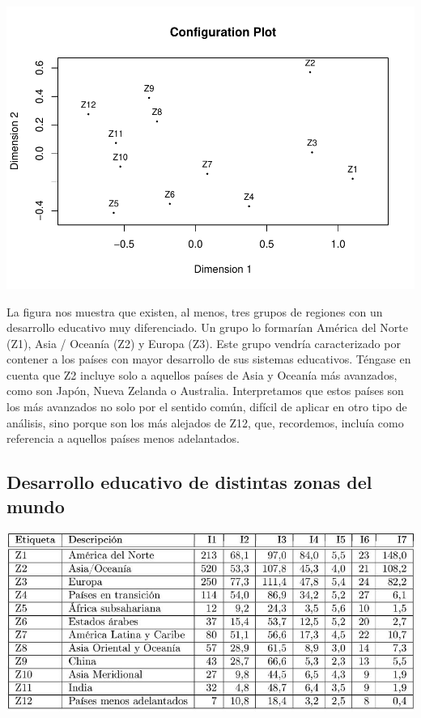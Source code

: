 \documentclass[]{article}
\begin{document}
\hypertarget{left}{}
\includegraphics{Clase-4_files/figure-latex/unnamed-chunk-22-1.pdf}

\hypertarget{right}{}
La figura nos muestra que existen, al menos, tres grupos de regiones con
un desarrollo educativo muy diferenciado. Un grupo lo formarían América
del Norte (Z1), Asia / Oceanía (Z2) y Europa (Z3). Este grupo vendría
caracterizado por contener a los países con mayor desarrollo de sus
sistemas educativos. Téngase en cuenta que Z2 incluye solo a aquellos
países de Asia y Oceanía más avanzados, como son Japón, Nueva Zelanda o
Australia. Interpretamos que estos países son los más avanzados no solo
por el sentido común, difícil de aplicar en otro tipo de análisis, sino
porque son los más alejados de Z12, que, recordemos, incluía como
referencia a aquellos países menos adelantados.

\subsection{Desarrollo educativo de distintas zonas del
mundo}\label{desarrollo-educativo-de-distintas-zonas-del-mundo-12}

\hypertarget{left}{}
\includegraphics[width=1\linewidth]{images/cuadro}
\end{document}

